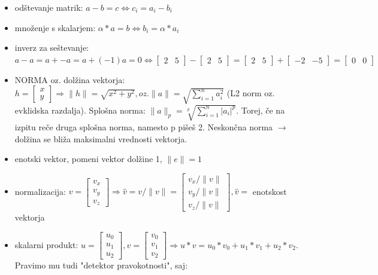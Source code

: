 \documentclass{article}
\begin{document}
\begin{itemize}
\item odštevanje matrik: $a - b = c \iff c_i = a_i - b_i$
\item množenje s skalarjem: $\alpha * a = b \iff b_i = \alpha * a_i$
\item inverz za seštevanje: $a - a = a + -a = a + (-1)a=0 \iff \begin{bmatrix} 2 & 5 \end{bmatrix} - \begin{bmatrix} 2 & 5 \end{bmatrix} = \begin{bmatrix} 2 & 5 \end{bmatrix} + \begin{bmatrix} -2 & -5 \end{bmatrix}=\begin{bmatrix} 0 & 0 \end{bmatrix}$
\item NORMA oz. dolžina vektorja: $h = \begin{bmatrix} x \\ y \end{bmatrix} \Longrightarrow \lVert h \rVert = \sqrt{x^2 + y^2}, oz. \lVert a \rVert = \sqrt{\sum_{i=1}^n a_i^2}$ (L2 norm oz. evklidska razdalja). Splošna norma: $\lVert a \rVert_p = \sqrt[p]{\sum_{i=1}^n |a_i|^p}$. Torej, če na izpitu reče druga splošna norma, namesto p pišeš 2. Neskončna norma $\to$ dolžina se bliža maksimalni vrednosti vektorja. 
\item enotski vektor, pomeni vektor dolžine 1, $\lVert e \rVert = 1$
\item normalizacija: $v = \begin{bmatrix} v_x \\ v_y \\ v_z \end{bmatrix} \Longrightarrow \hat{v} = v / \lVert v \rVert = \begin{bmatrix} v_x/\lVert v \rVert \\ v_y/\lVert v \rVert \\ v_z/\lVert v \rVert \end{bmatrix}, \hat{v} = $ enotskost vektorja 
\item skalarni produkt: $u = \begin{bmatrix} u_0 \\ u_1 \\ u_2 \end{bmatrix}, v = \begin{bmatrix} v_0 \\ v_1 \\ v_2 \end{bmatrix} \Longrightarrow u * v = u_0*v_0 + u_1*v_1 + u_2*v_2$. Pravimo mu tudi "detektor pravokotnosti", saj:

\end{itemize}
\end{document}
